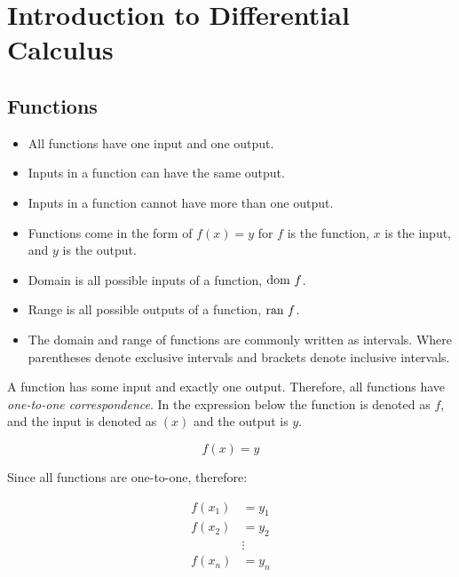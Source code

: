 
\chapter{Introduction to Differential Calculus}

\section{Functions}

\begin{tcolorbox}[colback=blue!10!white,colframe=blue!60!black,title=Main Ideas]
    \begin{itemize}
        \item All functions have one input and one output.
        \item Inputs in a function can have the same output.
        \item Inputs in a function cannot have more than one output.
        \item Functions come in the form of \(f(x)=y\) for \(f\) is the function, \(x\) is the input, and \(y\) is the output.
        \item Domain is all possible inputs of a function, \(\text{dom } f\).
        \item Range is all possible outputs of a function, \(\text{ran } f\).
        \item The domain and range of functions are commonly written as intervals. Where parentheses denote exclusive intervals and brackets denote inclusive intervals.
    \end{itemize}
\end{tcolorbox}

A function has some input and exactly one output. Therefore, all functions have \emph{one-to-one correspondence}. In the expression below the function is denoted as \(f\), and the input is denoted as \((x)\) and the output is \(y\).

\[
    f(x) = y
\]

Since all functions are one-to-one, therefore:

\begin{align*}
    f(x_1) &= y_1 \\ 
    f(x_2) &= y_2 \\
           &\vdots \\
    f(x_n) &= y_n \\
\end{align*}

